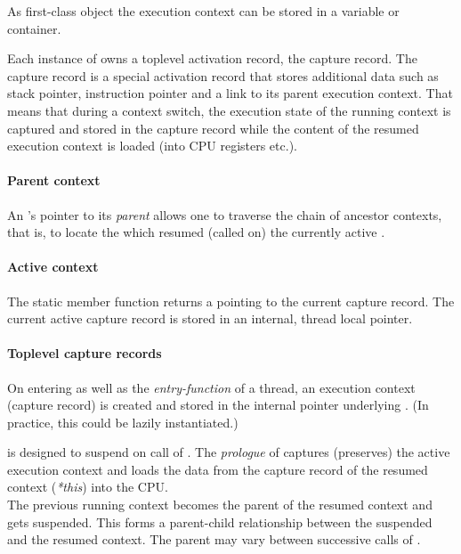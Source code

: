 As first-class object the execution context can be stored in a variable or
container.

Each instance of \ectx owns a toplevel activation record, the capture record.
The capture record is a special activation record that stores additional data
such as stack pointer, instruction pointer and a link to its parent execution
context. That means that during a context switch, the execution state
of the running context is captured and stored in the capture record while the
content of the resumed execution context is loaded (into CPU registers etc.).

\paragraph*{Parent context}
An 's pointer to
its \emph{parent}  allows one to traverse the chain of
ancestor contexts, that is, to locate the  which resumed
(called \ectxop on) the currently active .

\paragraph*{Active context}
The static member function \ectxcurrent returns a \ectx pointing to the
current capture record. The current active capture record is stored in an
internal, thread local pointer.

\paragraph*{Toplevel capture records}
On entering \main as well as the \emph{entry-function} of a thread, an execution
context (capture record) is created and stored in the internal pointer underlying
\ectxcurrent. (In practice, this could be lazily instantiated.)

\ectx is designed to suspend on call of \ectxop. The \emph{prologue} of \ectxop
captures (preserves) the active execution context and loads the data from the
capture record of the resumed context (\emph{*this}) into the CPU.\\
The previous running context becomes the parent of the resumed context and gets
suspended. This forms a parent-child relationship between the suspended and
the resumed context. The parent may vary between successive calls of \ectxop.

